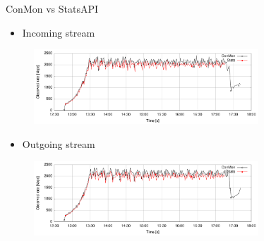 \documentclass[first=red,second=purple,logo=yellowexc]{aaltoslides}
\begin{document}
\begin{frame}{ConMon vs StatsAPI}
\begin{itemize}
\item Incoming stream
\end{itemize}
\begin{figure}[h]
  \centering
  \includegraphics[width=0.75\textwidth]{p2p_incomming_cable_sample.pdf}
\end{figure}
\begin{itemize}
\item Outgoing stream
\end{itemize}
\begin{figure}[h]
  \centering
  \includegraphics[width=0.75\textwidth]{p2p_outgoing_cable_sample.pdf}
\end{figure}
\end{frame}
\end{document}
